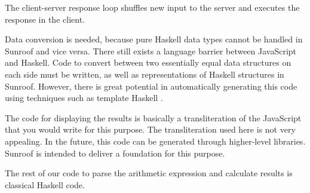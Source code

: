 The client-server response loop shuffles new input to the server 
and executes the response in the client.

Data conversion is needed, because pure Haskell data types
cannot be handled in Sunroof and vice versa. There still
exists a language barrier between JavaScript and Haskell. 
Code to convert between two essentially equal data structures on 
each side must be written, as well as representations of Haskell 
structures in Sunroof. However, there is great potential in automatically 
generating this code using techniques such as template Haskell
\cite{Sheard:02:TemplateMetaProgrammingHaskell}.

The code for displaying the results is basically a 
transliteration of the JavaScript that you would write for this 
purpose.
The transliteration used here is not very appealing. 
In the future, this code can be generated through higher-level 
libraries. Sunroof is intended to deliver a foundation for
this purpose.

The rest of our code to parse the arithmetic expression and calculate 
results is classical Haskell code. 
